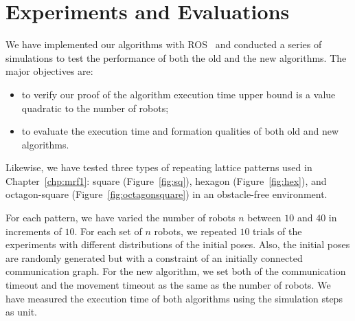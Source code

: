 \section{Experiments and Evaluations}
\label{sec:exp}
We have implemented our algorithms with ROS~\cite{QuiConGerFauFooLeiWheNg09,CouGerConGar10} and conducted a series of simulations to test the performance of both the old and the new algorithms. 
%
The major objectives are:
\begin{itemize}
\item to verify our proof of the algorithm execution time upper bound is a value quadratic to the number of robots;
\item to evaluate the execution time and formation qualities of both old and new algorithms.
\end{itemize} 
 
 
Likewise, we have tested three types of repeating lattice patterns used in Chapter~\ref{chp:mrf1}:
square (Figure~\ref{fig:sq}), hexagon (Figure~\ref{fig:hex}), and octagon-square (Figure~\ref{fig:octagonsquare}) in an obstacle-free environment.
  
  
For each pattern, we have varied the number of robots $n$ between $10$ and $40$ in increments of $10$. 
%
For each set of $n$ robots, we repeated $10$ trials of the experiments with different distributions
of the initial poses. 
%
Also, the initial poses are randomly generated but with a constraint of an initially connected communication graph. 
%
For the new algorithm, we set both of the communication timeout and the movement timeout as the same as the number of robots. 
%
We have measured the execution time of both algorithms using the simulation steps as unit. 


